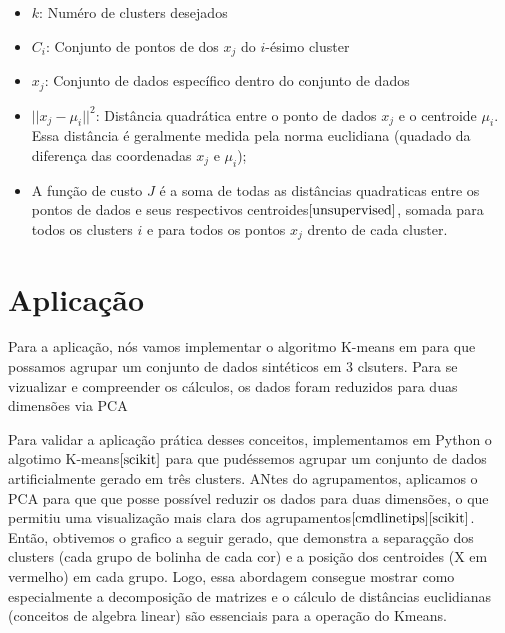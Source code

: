 \documentclass[a4paper,12pt]{article}
\begin{document}
 
\begin{itemize}
    \item $k$: Numéro de clusters desejados
    \item $C_i$: Conjunto de pontos de dos $x_j$ do $i$-ésimo cluster
    \item $x_j$: Conjunto de dados específico dentro do conjunto de dados
    \item $||x_j - \mu_i||^2$: Distância quadrática entre o ponto de dados $x_j$ e o centroide $\mu_i$. Essa distância é geralmente medida pela norma euclidiana (quadado da diferença das coordenadas $x_j$ e $\mu_i$); 
    \item A função de custo $J$ é a soma de todas as distâncias quadraticas entre os pontos de dados e seus respectivos centroides$\cite{unsupervised}$, somada para todos os clusters $i$ e para todos os pontos $x_j$ drento de cada cluster.
\end{itemize}

\section{Aplicação}

Para a aplicação, nós vamos implementar o algoritmo K-means em  para que possamos agrupar um conjunto de dados sintéticos em 3 clsuters. Para se vizualizar e compreender os cálculos, os dados foram reduzidos para duas dimensões via PCA




Para validar a aplicação prática desses conceitos, implementamos em Python o algotimo K-means$\cite{scikit}$ para que pudéssemos agrupar um conjunto de dados artificialmente gerado em três clusters. ANtes do agrupamentos, aplicamos o PCA para que que posse possível reduzir os dados para duas dimensões, o que permitiu uma visualização mais clara dos agrupamentos$\cite{cmdlinetips}\cite{scikit}$. Então, obtivemos o grafico a seguir gerado, que demonstra a separaçção dos clusters (cada grupo de bolinha de cada cor) e a posição dos centroides (X em vermelho)  em cada grupo. Logo, essa abordagem consegue mostrar como especialmente a decomposição de matrizes e o cálculo de distâncias euclidianas (conceitos de algebra linear) são essenciais para a operação do Kmeans.
\end{document}
